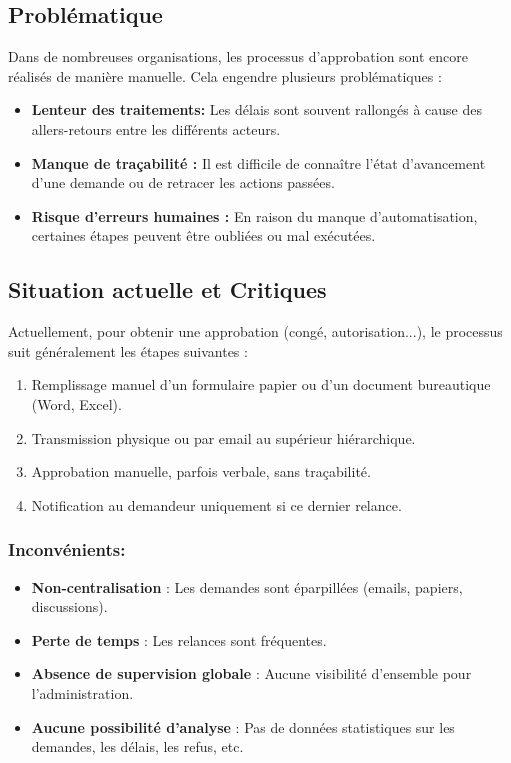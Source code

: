 \subsection{ Problématique } 
Dans de nombreuses organisations, les processus d’approbation sont encore réalisés de manière manuelle. Cela engendre plusieurs problématiques :
\begin{itemize}
  \item \textbf{Lenteur des traitements: }Les délais sont souvent rallongés à cause des allers-retours entre les différents acteurs.
  \item \textbf{Manque de traçabilité :} Il est difficile de connaître l’état d’avancement d’une demande ou de retracer les actions passées.
  \item \textbf{Risque d’erreurs humaines : }En raison du manque d’automatisation, certaines étapes peuvent être oubliées ou mal exécutées.
\end{itemize}

\subsection{ Situation actuelle et Critiques } 
Actuellement, pour obtenir une approbation (congé, autorisation...), le processus suit généralement les étapes suivantes :
\begin{enumerate}
    \item Remplissage manuel d’un formulaire papier ou d’un document bureautique (Word, Excel).
    \item Transmission physique ou par email au supérieur hiérarchique.
    \item Approbation manuelle, parfois verbale, sans traçabilité.
    \item Notification au demandeur uniquement si ce dernier relance.
\end{enumerate}
\subsubsection*{Inconvénients:}
\begin{itemize}
    \item \textbf{Non-centralisation} : Les demandes sont éparpillées (emails, papiers, discussions).
    \item \textbf{Perte de temps} : Les relances sont fréquentes.
    \item \textbf{Absence de supervision globale} : Aucune visibilité d’ensemble pour l’administration.
    \item \textbf{Aucune possibilité d’analyse} : Pas de données statistiques sur les demandes, les délais, les refus, etc.
\end{itemize}

